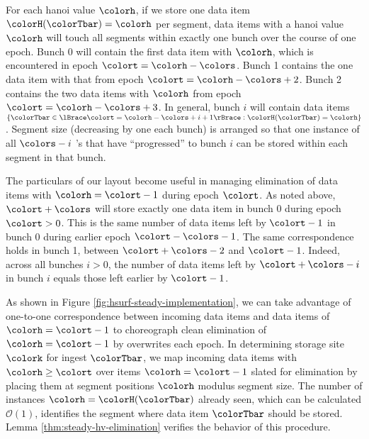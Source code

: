 For each hanoi value $\colorh$, if we store one data item $\colorH(\colorTbar) = \colorh$ per segment, data items with a hanoi value $\colorh$ will touch all segments within exactly one bunch over the course of one epoch.
Bunch 0 will contain the first data item with \hv{} $\colorh$, which is encountered in epoch $\colort=\colorh - \colors$.
Bunch 1 contains the one data item with that \hv{} from epoch $\colort=\colorh - \colors + 2$.
Bunch 2 contains the two data items with \hv{} $\colorh$ from epoch $\colort=\colorh - \colors + 3$.
In general, bunch $i$ will contain data items $\{ \colorTbar \in \lBrace \colort = \colorh - \colors + i + 1 \rBrace : \colorH(\colorTbar) = \colorh \}$.
Segment size (decreasing by one each bunch) is arranged so that one instance of all $\colors - i$ \hv's that have ``progressed'' to bunch $i$ can be stored within each segment in that bunch.



The particulars of our layout become useful in managing elimination of data items with \hv{} $\colorh = \colort - 1$ during epoch $\colort$.
As noted above, \hv{} $\colort + \colors$ will store exactly one data item in bunch 0 during epoch $\colort > 0$.
This is the same number of data items left by \hv{} $\colort - 1$ in bunch 0 during earlier epoch $\colort - \colors - 1$.
The same correspondence holds in bunch 1, between \hv{} $\colort + \colors - 2$ and \hv{} $\colort - 1$.
Indeed, across all bunches $i>0$, the number of data items left by \hv{} $\colort + \colors - i$ in bunch $i$ equals those left earlier by \hv{} $\colort - 1$.

As shown in Figure \ref{fig:hsurf-steady-implementation}, we can take advantage of one-to-one correspondence between incoming data items and data items of \hv{} $\colorh=\colort-1$ to choreograph clean elimination of \hv{} $\colorh=\colort-1$ by overwrites each epoch.
In determining storage site $\colork$ for ingest $\colorTbar$, we map incoming data items with \hv{} $\colorh \geq \colort$ over items $\colorh = \colort - 1$ slated for elimination by placing them at segment positions $\colorh$ modulus segment size.
The number of \hv{} instances $\colorh = \colorH(\colorTbar)$ already seen, which can be calculated $\mathcal{O}(1)$, identifies the segment where data item $\colorTbar$ should be stored.
Lemma \ref{thm:steady-hv-elimination} verifies the behavior of this procedure.



